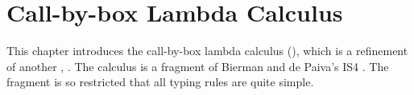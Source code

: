 \chapter{Call-by-box Lambda Calculus }
\label{chap:box-lambda-calculus}

This chapter introduces the call-by-box lambda calculus (\lab), which is a refinement of another \lc, \labox \cite{espritosanto_et_al:LIPIcs:2019:10525}.
The calculus \labox is a fragment of Bierman and de Paiva's \textsf{IS4} \cite{BiermanPaiva2000}.
The fragment is so restricted that all typing rules are quite simple.

